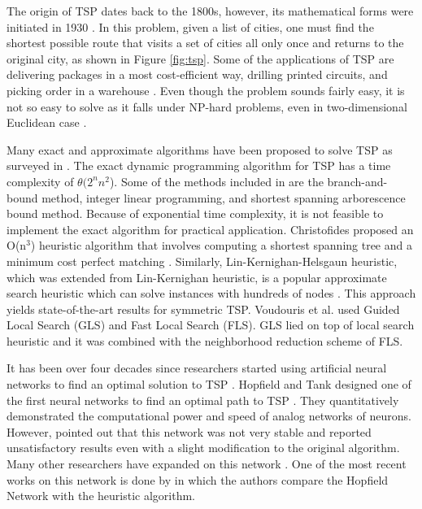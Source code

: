 \documentclass{article}
\begin{document}
The origin of TSP dates back to the 1800s, however, its mathematical forms were initiated in 1930 \cite{sarwar2012critical}. In this problem, given a list of cities, one must find the shortest possible route that visits a set of cities all only once and returns to the original city, as shown in Figure \ref{fig:tsp}. Some of the applications of TSP are delivering packages in a most cost-efficient way, drilling printed circuits, and picking order in a warehouse \cite{applegate2006traveling, la2012comparison, junger1994provably}. Even though the problem sounds fairly easy, it is not so easy to solve as it falls under NP-hard problems, even in two-dimensional Euclidean case \cite{padberg1991branch, bello2016neural}. 

Many exact and approximate algorithms have been proposed to solve TSP as surveyed in \cite{laporte1992traveling}. The exact dynamic programming algorithm for TSP has a time complexity of $\theta(2^nn^2$). Some of the methods included in \cite{laporte1992traveling} are the branch-and-bound method, integer linear programming, and shortest spanning arborescence bound method. Because of exponential time complexity, it is not feasible to implement the exact algorithm for practical application. Christofides proposed an O(n$^3$) heuristic algorithm that involves computing a shortest spanning tree and a minimum cost perfect matching \cite{christofides1976worst, bello2016neural, laporte1992traveling}. Similarly, Lin-Kernighan-Helsgaun heuristic, which was extended from Lin-Kernighan heuristic, is a popular approximate search heuristic which can solve instances with hundreds of nodes \cite{bello2016neural, helsgaun2000effective, lin1973effective}. This approach yields state-of-the-art results for symmetric TSP. Voudouris et al. \cite{voudouris1999guided} used Guided Local Search (GLS) and Fast Local Search (FLS). GLS lied on top of local search heuristic and it was combined with the neighborhood reduction scheme of FLS.

It has been over four decades since researchers started using artificial neural networks to find an optimal solution to TSP \cite{smith1999neural}. Hopfield and Tank designed one of the first neural networks to find an optimal path to TSP \cite{hopfield1985neural}. They quantitatively demonstrated the computational power and speed of analog networks of neurons. However, \cite{wilson1988stability} pointed out that this network was not very stable and reported unsatisfactory results even with a slight modification to the original algorithm. Many other researchers have expanded on this network \cite{aiyer1990theoretical}. One of the most recent works on this network is done by \cite{sarwar2012critical} in which the authors compare the Hopfield Network with the heuristic algorithm. 
\end{document}
